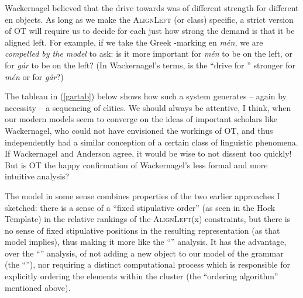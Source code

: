 \documentclass[output=paper,
modfonts
]{LSP/langsci}
\begin{document}
Wackernagel believed that the drive towards  was of different
strength for different en objects. As long as we make the \textsc{AlignLeft} 
 (or  class) specific, a strict  version of OT will require us to decide
for each  just how strong the demand is that it be aligned left. For example, if we
take the Greek -marking en \textit{mén,} we are \textit{compelled by the model} to ask: is it more
important for \textit{mén} to be on the left, or for \textit{gár} to be on the left? (In Wackernagel's terms,
is the ``drive for '' stronger for \textit{mén} or for \textit{gár}?)

The tableau in (\ref{gartab}) below shows how such a system generates -- again by necessity -- a
sequencing of clitics. We should always be attentive, I think, when our modern models seem to converge
on the ideas of important scholars like Wackernagel, who could not have envisioned the workings
of OT, and thus independently had a similar conception of a certain class of linguistic phenomena.
If Wackernagel and Anderson agree, it would be wise to not dissent too quickly!
But is OT the happy confirmation of Wackernagel's less formal and more intuitive analysis?

The model in some sense combines properties of the two earlier approaches I sketched: there
is a sense of a ``fixed stipulative order'' (as seen in the Hock Template) in the relative rankings of
the \textsc{AlignLeft}(x) constraints, but there is no sense of fixed stipulative positions in the
resulting representation (as that model implies), thus making it more like the ``''
analysis. It has the advantage, over the ``'' analysis, of not adding a new object
to our model of the grammar (the ``''), nor requiring a distinct computational
process which is responsible for explicitly ordering the elements within the cluster (the ``ordering
algorithm'' mentioned above).
\end{document}
